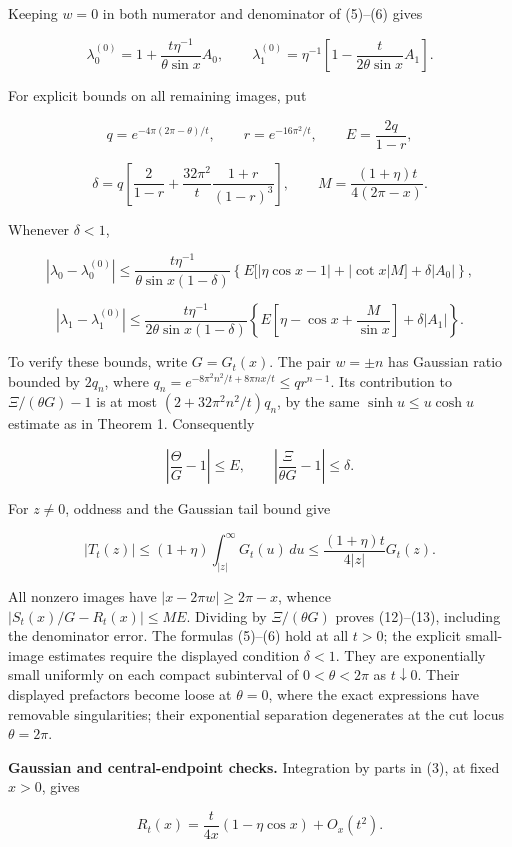 \documentclass[11pt,a4paper]{article}
\begin{document}
Keeping \(w=0\) in both numerator and denominator of (5)--(6) gives

\[\lambda_0^{(0)}=1+\frac{t\eta^{-1}}{\theta\sin x}A_0,
\qquad
\lambda_1^{(0)}=\eta^{-1}\left[1-\frac{t}{2\theta\sin x}A_1\right].
\tag{11}\]

For explicit bounds on all remaining images, put

\[q=e^{-4\pi(2\pi-\theta)/t},\qquad r=e^{-16\pi^2/t},\qquad
E=\frac{2q}{1-r},\]

\[
\delta=q\left[\frac2{1-r}+\frac{32\pi^2}{t}
\frac{1+r}{(1-r)^3}\right],\qquad
M=\frac{(1+\eta)t}{4(2\pi-x)}.\]

Whenever \(\delta<1\),

\[|\lambda_0-\lambda_0^{(0)}|
\le\frac{t\eta^{-1}}{\theta\sin x(1-\delta)}
\left\{E\bigl[|\eta\cos x-1|+|\cot x|M\bigr]
+\delta|A_0|\right\}, \tag{12}\]

\[|\lambda_1-\lambda_1^{(0)}|
\le\frac{t\eta^{-1}}{2\theta\sin x(1-\delta)}
\left\{E\left[\eta-\cos x+\frac M{\sin x}\right]
+\delta|A_1|\right\}. \tag{13}\]

To verify these bounds, write \(G=G_t(x)\). The pair \(w=\pm n\) has
Gaussian ratio bounded by \(2q_n\), where
\(q_n=e^{-8\pi^2n^2/t+8\pi nx/t}\le q r^{n-1}\). Its contribution to
\(\Xi/(\theta G)-1\) is at most \((2+32\pi^2n^2/t)q_n\), by the same
\(\sinh u\le u\cosh u\) estimate as in Theorem 1. Consequently

\[\left|\frac\Theta G-1\right|\le E,\qquad
\left|\frac\Xi{\theta G}-1\right|\le\delta.\]

For \(z\ne0\), oddness and the Gaussian tail bound give

\[|T_t(z)|\le(1+\eta)\int_{|z|}^\infty G_t(u)\,du
\le\frac{(1+\eta)t}{4|z|}G_t(z).\]

All nonzero images have \(|x-2\pi w|\ge2\pi-x\), whence
\(|S_t(x)/G-R_t(x)|\le ME\). Dividing by \(\Xi/(\theta G)\) proves
(12)--(13), including the denominator error. The formulas (5)--(6) hold
at all \(t>0\); the explicit small-image estimates require the displayed
condition \(\delta<1\). They are exponentially small uniformly on each
compact subinterval of \(0<\theta<2\pi\) as \(t\downarrow0\). Their
displayed prefactors become loose at \(\theta=0\), where the exact
expressions have removable singularities; their exponential separation
degenerates at the cut locus \(\theta=2\pi\).

\textbf{Gaussian and central-endpoint checks.} Integration by parts in
(3), at fixed \(x>0\), gives

\[R_t(x)=\frac{t}{4x}(1-\eta\cos x)+O_x(t^2).\]
\end{document}
